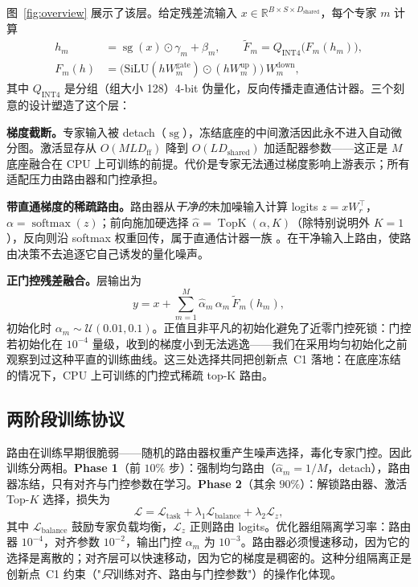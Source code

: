 \documentclass[10pt,twoside]{article}
\newcommand{\stopgrad}{\operatorname{sg}}
\newcommand{\topk}{\operatorname{TopK}}
\newcommand{\softmax}{\operatorname{softmax}}
\newcommand{\R}{\mathbb{R}}
\begin{document}
图~\ref{fig:overview} 展示了该层。给定残差流输入 $x \in \R^{B \times S \times D_{\text{shared}}}$，每个专家 $m$ 计算
\begin{align}
\label{eq:expert}
h_m &= \stopgrad(x) \odot \gamma_m + \beta_m, \qquad
\tilde F_m = Q_{\text{INT4}}\big(F_m(h_m)\big), \\
F_m(h) &= \big(\mathrm{SiLU}(h W^{\text{gate}}_m) \odot (h W^{\text{up}}_m)\big)\, W^{\text{down}}_m,
\end{align}
其中 $Q_{\text{INT4}}$ 是分组（组大小 128）4-bit 伪量化，反向传播走直通估计器。三个刻意的设计塑造了这个层：

\textbf{梯度截断。}专家输入被 detach（$\stopgrad$），冻结底座的中间激活因此永不进入自动微分图。激活显存从 $O(M L D_{\text{ff}})$ 降到 $O(L D_{\text{shared}})$ 加适配器参数——这正是 $M$ 底座融合在 CPU 上可训练的前提。代价是专家无法通过梯度影响上游表示；所有适配压力由路由器和门控承担。

\textbf{带直通梯度的稀疏路由。}路由器从\emph{干净的}未加噪输入计算 logits $z = x W_r^\top$，$\alpha = \softmax(z)$；前向施加硬选择 $\hat\alpha = \topk(\alpha, K)$（除特别说明外 $K{=}1$），反向则沿 softmax 权重回传，属于直通估计器一族 \citep{bengio2013}。在干净输入上路由，使路由决策不去追逐它自己诱发的量化噪声。

\textbf{正门控残差融合。}层输出为
\begin{equation}
\label{eq:fuse}
y = x + \sum_{m=1}^{M} \hat\alpha_m \, \alpha_m \, \tilde F_m(h_m),
\end{equation}
初始化时 $\alpha_m \sim \mathcal{U}(0.01, 0.1)$。正值且非平凡的初始化避免了近零门控死锁：门控若初始化在 $10^{-4}$ 量级，收到的梯度小到无法逃逸——我们在采用均匀初始化之前观察到过这种平直的训练曲线。这三处选择共同把创新点~C1 落地：在底座冻结的情况下，CPU 上可训练的门控式稀疏 top-K 路由。

\subsection{两阶段训练协议}
\label{sec:training}

路由在训练早期很脆弱——随机的路由器权重产生噪声选择，毒化专家门控。因此训练分两相。\textbf{Phase 1}（前 $10\%$ 步）：强制均匀路由（$\hat\alpha_m = 1/M$，detach），路由器冻结，只有对齐与门控参数在学习。\textbf{Phase 2}（其余 $90\%$）：解锁路由器、激活 Top-$K$ 选择，损失为
\begin{equation}
\label{eq:loss}
\mathcal{L} = \mathcal{L}_{\text{task}} + \lambda_1 \mathcal{L}_{\text{balance}} + \lambda_2 \mathcal{L}_{z},
\end{equation}
其中 $\mathcal{L}_{\text{balance}}$ 鼓励专家负载均衡，$\mathcal{L}_{z}$ 正则路由 logits。优化器组隔离学习率：路由器 $10^{-4}$，对齐参数 $10^{-2}$，输出门控 $\alpha_m$ 为 $10^{-3}$。路由器必须慢速移动，因为它的选择是离散的；对齐层可以快速移动，因为它的梯度是稠密的。这种分组隔离正是创新点~C1 约束（"\emph{只}训练对齐、路由与门控参数"）的操作化体现。
\end{document}
